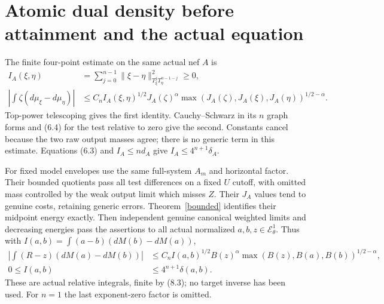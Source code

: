 \documentclass[10pt]{article}
\newcommand{\EE}{\mathcal E^1_\theta}
\begin{document}
\section{Atomic dual density before attainment and the actual equation}
The finite four-point estimate on the same actual nef $A$ is
\[
\begin{aligned}
 I_A(\xi,\eta)&=\sum_{j=0}^{n-1}
 \|\xi-\eta\|^2_{T_\xi^jT_\eta^{n-1-j}}\geq0,\\
 \left|\int\zeta(d\mu_\xi-d\mu_\eta)\right|
 &\leq C_n I_A(\xi,\eta)^{1/2}J_A(\zeta)^\alpha
       \max(J_A(\zeta),J_A(\xi),J_A(\eta))^{1/2-\alpha}.
\end{aligned}
 \tag{12.1}
\]
Top-power telescoping gives the first identity. Cauchy--Schwarz in its
$n$ graph forms and (6.4) for the test relative to zero give the second.
Constants cancel because the two raw output masses agree; there is no
generic term in this estimate. Equations (6.3) and $I_A\leq n d_A$ give
$I_A\leq4^{n+1}\delta_A$.

For fixed model envelopes use the same full-system $A_m$ and horizontal
factor. Their bounded quotients pass all test differences on a fixed $U$
cutoff, with omitted mass controlled by the weak output limit which misses
$Z$. Their $J_A$ values tend to genuine costs, retaining generic errors.
Theorem~\ref{bounded} identifies their midpoint energy exactly.
Then independent genuine canonical weighted limits and decreasing energies
pass the assertions to all actual normalized $a,b,z\in\EE$. Thus with
$I(a,b)=\int(a-b)(dM(b)-dM(a))$,
\[
\begin{aligned}
 \left|\int(R-z)(dM(a)-dM(b))\right|
 &\leq C_n I(a,b)^{1/2}B(z)^\alpha
     \max(B(z),B(a),B(b))^{1/2-\alpha},\\
 0\leq I(a,b)&\leq4^{n+1}\delta(a,b).
\end{aligned}
 \tag{12.2}
\]
These are actual relative integrals, finite by (8.3); no target inverse
has been used. For $n=1$ the last exponent-zero factor is omitted.
\end{document}
